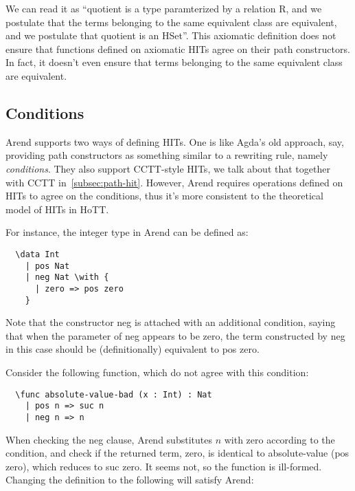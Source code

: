 We can read it as ``\textsf{quotient} is a type paramterized by a relation \textsf R,
and we postulate that the terms belonging to the same equivalent class are equivalent,
and we postulate that \textsf{quotient} is an HSet''.
This axiomatic definition does not ensure that functions defined on
axiomatic HITs agree on their path constructors.
In fact, it doesn't even ensure that terms belonging to the same equivalent
class are equivalent.



\subsection{Conditions}
\label{subsec:conditions}

Arend supports two ways of defining HITs.
One is like Agda's old approach, say, providing path constructors
as something similar to a rewriting rule, namely \textit{conditions}.
They also support CCTT-style HITs, we talk about that together with
CCTT in~\cref{subsec:path-hit}.
However, Arend requires operations defined on HITs to agree on the conditions,
thus it's more consistent to the theoretical model of HITs in HoTT.

For instance, the integer type in Arend can be defined as:

\begin{verbatim}
  \data Int
    | pos Nat
    | neg Nat \with {
      | zero => pos zero
    }
\end{verbatim}

Note that the constructor \textsf{neg} is attached with an additional
condition, saying that when the parameter of
\textsf{neg} appears to be \textsf{zero},
the term constructed by \textsf{neg} in this case should be
(definitionally) equivalent to \textsf{pos zero}.

Consider the following function, which do not agree with this condition:

\begin{verbatim}
  \func absolute-value-bad (x : Int) : Nat
    | pos n => suc n
    | neg n => n
\end{verbatim}

When checking the \textsf{neg} clause, Arend substitutes $n$ with
\textsf{zero} according to the condition, and check if the returned
term, \textsf{zero}, is identical to
\textsf{absolute-value (pos zero)}, which reduces to \textsf{suc zero}.
It seems not, so the function is ill-formed.
Changing the definition to the following will satisfy Arend:


